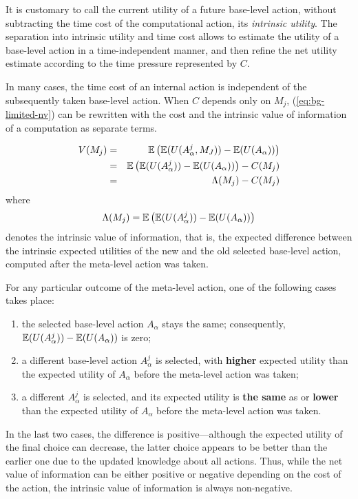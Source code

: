 It is customary to call the current utility of a future base-level
action, without subtracting the time cost of the computational action,
its {\em intrinsic utility}. The separation into intrinsic
utility and time cost allows to estimate the utility of a base-level
action in a time-independent manner, and then refine the net utility
estimate according to the time pressure represented by $C$.

In many cases, the time cost of an internal action is independent of
the subsequently taken base-level action. When $C$ depends only on
$M_j$, (\ref{eq:bg-limited-nv}) can be rewritten with the cost and the
intrinsic value of information of a computation as separate terms.

\begin{eqnarray}
\label{eq:bg-limited-v=bc}
V(M_j)&=&\mathbb{E}\left(\mathbb{E}(U(A_\alpha^j, M_J))-\mathbb{E}(U(A_\alpha))\right)\nonumber\\
     &=&\mathbb{E}\left(\mathbb{E}(U(A_\alpha^j))-\mathbb{E}(U(A_\alpha))\right)-C(M_j)\\
     &=& \Lambda(M_j)-C(M_j)
\end{eqnarray}
where
\begin{equation}
\label{eq:bg-limited-benefit}
\Lambda(M_j)=\mathbb{E}\left(\mathbb{E}(U(A_\alpha^j))-\mathbb{E}(U(A_\alpha))\right)
\end{equation}
denotes the intrinsic value of information, that is, the expected
difference between the intrinsic expected utilities of the new
and the old selected base-level action, computed after the meta-level
action was taken.

For any particular outcome of the meta-level action, one of the
following cases takes place:

\begin{enumerate}
\item the selected base-level action $A_\alpha$ stays the same;
  consequently, $\mathbb{E}(U(A_\alpha^j))-\mathbb{E}(U(A_\alpha))$ is zero;
\item a different base-level action $A_\alpha^j$ is selected, with
  {\bf higher} expected utility than the expected utility of
  $A_\alpha$ before the meta-level action was taken;
\item a different $A_\alpha^j$ is selected, and its expected
  utility is {\bf the same} as or {\bf lower} than the expected
  utility of $A_\alpha$ before the meta-level action was taken.
\end{enumerate}

In the last two cases, the difference is positive---although the
expected utility of the final choice can decrease, the latter
choice appears to be better than the earlier one due
to the updated knowledge about all actions. Thus, while the
net value of information can be either positive or negative depending on
the cost of the action, the intrinsic value of information is always
non-negative.

